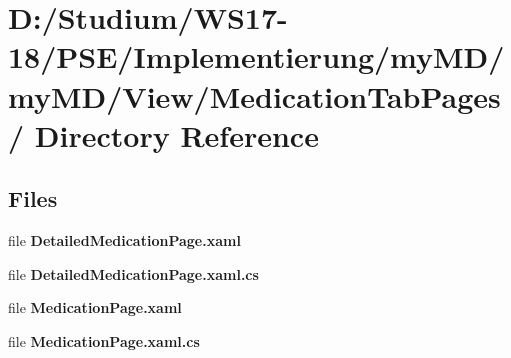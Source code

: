 \hypertarget{dir_D_3A_2FStudium_2FWS17_2D18_2FPSE_2FImplementierung_2FmyMD_2FmyMD_2FView_2FMedicationTabPages_2F}{
\section{D:/Studium/WS17-18/PSE/Implementierung/my\-MD/my\-MD/View/Medication\-Tab\-Pages/ Directory Reference}
\label{dir_D_3A_2FStudium_2FWS17_2D18_2FPSE_2FImplementierung_2FmyMD_2FmyMD_2FView_2FMedicationTabPages_2F}
}


\subsection*{Files}
\begin{CompactItemize}
\item 
file {\bf Detailed\-Medication\-Page.xaml}
\item 
file {\bf Detailed\-Medication\-Page.xaml.cs}
\item 
file {\bf Medication\-Page.xaml}
\item 
file {\bf Medication\-Page.xaml.cs}
\end{CompactItemize}
